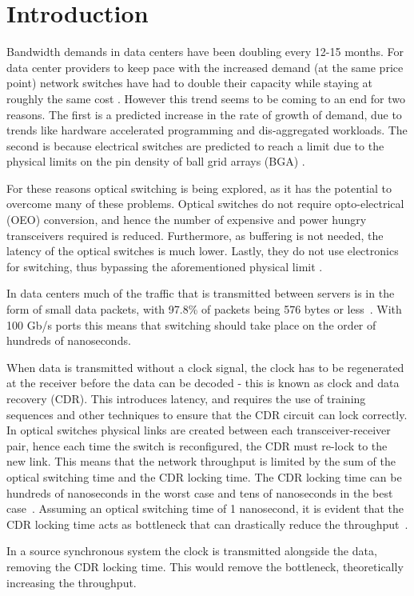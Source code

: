\chapter{Introduction}
Bandwidth demands in data centers have been doubling every 12-15 months. For
data center providers to keep pace with the increased demand (at the same price
point) network switches have had to double their capacity while staying at
roughly the same cost \cite{singh2016jupiter}. However this trend seems to be
coming to an end for two reasons. The first is a predicted increase in the rate
of growth of demand, due to trends like hardware accelerated programming and
dis-aggregated workloads. The second is because electrical switches are
predicted to reach a limit due to the physical limits on the pin density of
ball grid arrays (BGA) \cite{ballani2018bridging}.

For these reasons optical switching is being explored, as it has the potential
to overcome many of these problems. Optical switches do not require
opto-electrical (OEO) conversion, and hence the number of expensive and power
hungry transceivers required is reduced. Furthermore, as buffering is not
needed, the latency of the optical switches is much lower. Lastly, they do not
use electronics for switching, thus bypassing the aforementioned physical limit
\cite{ballani2018bridging}. 

In data centers much of the traffic that is transmitted between servers is in
the form of small data packets, with 97.8\% of packets being 576 bytes or
less~\cite{data_size}. With 100 Gb/s ports this means that switching should
take place on the order of hundreds of nanoseconds. 

When data is transmitted without a clock signal, the clock has to be
regenerated at the receiver before the data can be decoded - this is known as
clock and data recovery (CDR). This introduces latency, and requires the use of
training sequences and other techniques to ensure that the CDR circuit can lock
correctly. In optical switches physical links are created between each
transceiver-receiver pair, hence each time the switch is reconfigured, the CDR
must re-lock to the new link.  This means that the network throughput is
limited by the sum of the optical switching time and the CDR locking time. The
CDR locking time can be hundreds of nanoseconds in the worst case and tens of
nanoseconds in the best case~\cite{Chen:18}. Assuming an optical switching time
of 1 nanosecond, it is evident that the CDR locking time acts as bottleneck
that can drastically reduce the throughput~\cite{kari_phase}.

In a source synchronous system the clock is transmitted alongside the data,
removing the CDR locking time. This would remove the bottleneck, theoretically
increasing the throughput.

